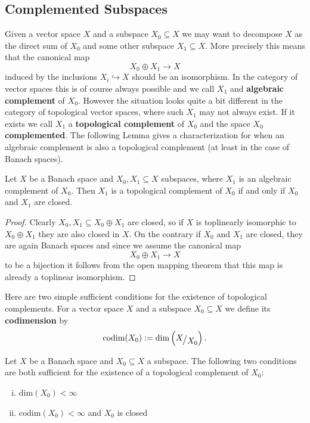 \subsection{Complemented Subspaces}

Given a vector space $X$ and a subspace $X_0 \subseteq X$ we may want to decompose $X$ as the direct sum of $X_0$ and some other subspace $X_1 \subseteq X$. More precisely this means that the canonical map 
\[
X_0 \oplus X_1 \to X
\]
induced by the inclusions $X_i \hookrightarrow X$ should be an isomorphism. In the category of vector spaces this is of course always possible and we call $X_1$ and \textbf{algebraic complement} of $X_0$. However the situation looks quite a bit different in the category of topological vector spaces, where such $X_1$ may not always exist. If it exists we call $X_1$ a \textbf{topological complement} of $X_0$ and the space $X_0$ \textbf{complemented}. The following Lemma gives a characterization for when an algebraic complement is also a topological complement (at least in the case of Banach spaces).

\begin{lemma}
    \label{funkana:lem:alg_vs_top_complement}
    Let $X$ be a Banach space and $X_0,X_1 \subseteq X$ subspaces, where $X_1$ is an algebraic complement of $X_0$. Then $X_1$ is a topological complement of $X_0$ if and only if $X_0$ and $X_1$ are closed.
\end{lemma}
\begin{proof}
    Clearly $X_0,X_1 \subseteq X_0 \oplus X_1$ are closed, so if $X$ is toplinearly isomorphic to $X_0 \oplus X_1$ they are also closed in $X$. On the contrary if $X_0$ and $X_1$ are closed, they are again Banach spaces and since we assume the canonical map 
    \[
    X_0 \oplus X_1 \to X
    \]
    to be a bijection it follows from the open mapping theorem that this map is already a toplinear isomorphism.
\end{proof}

Here are two simple sufficient conditions for the existence of topological complements. For a vector space $X$ and a subspace $X_0 \subseteq X$ we define its \textbf{codimension} by 
\[
\mathrm{codim}(X_0) := \mathrm{dim}\left(\modulo{X}{X_0}\right).
\]

\begin{lemma}
    Let $X$ be a Banach space and $X_0 \subseteq X$ a subspace. The following two conditions are both sufficient for the existence of a topological complement of $X_0$: 
    \begin{enumerate}[(i)]
        \item $\mathrm{dim}(X_0) < \infty$
        \item $\mathrm{codim}(X_0) < \infty$ and $X_0$ is closed
    \end{enumerate}
\end{lemma}

